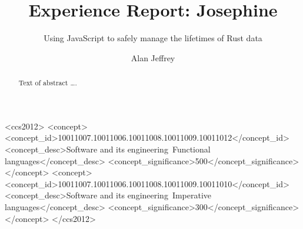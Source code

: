 \documentclass[acmsmall]{acmart}
\begin{document}
\title[Josephine]{Experience Report: Josephine}
\subtitle{Using JavaScript to safely manage the lifetimes of Rust data}

\author{Alan Jeffrey}

\begin{abstract}
Text of abstract \ldots.
\end{abstract}

\begin{CCSXML}
<ccs2012>
<concept>
<concept_id>10011007.10011006.10011008.10011009.10011012</concept_id>
<concept_desc>Software and its engineering~Functional languages</concept_desc>
<concept_significance>500</concept_significance>
</concept>
<concept>
<concept_id>10011007.10011006.10011008.10011009.10011010</concept_id>
<concept_desc>Software and its engineering~Imperative languages</concept_desc>
<concept_significance>300</concept_significance>
</concept>
</ccs2012>
\end{CCSXML}



\maketitle








\end{document}
